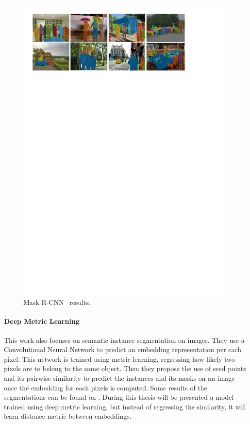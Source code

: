\begin{figure}[h]
  \centering
  \includegraphics[width=1.\linewidth]{figures/maskrcnn/results.pdf}
  \caption{Mask R-CNN~\maskrcnn{} results. }
  \label{fig:stateofart:maskrcnn}
\end{figure}

\paragraph{Deep Metric Learning~\deepml{}}
This work also focuses on semantic instance segmentation on images.
They use a Convolutional Neural Network to predict an embedding representation per each pixel.
This network is trained using metric learning, regressing how likely two pixels are to belong to the same object.
Then they propose the use of seed points and its pairwise similarity to predict the instances and its masks on an image once the embedding for each pixels is computed.
Some results of the segmentations can be found on .
During this thesis will be presented a model trained using deep metric learning, but instead of regressing the similarity, it will learn distance metric between embeddings.

